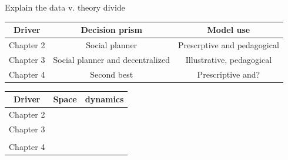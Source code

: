 Explain the data v. theory divide
\begin{table}[H]
\centering

\begin{tabular}{c|c|c}
Driver &  Decision prism  & Model use   \\
\hline
Chapter 2      &  Social planner         &   Prescrptive and pedagogical   \\
\hline
Chapter 3      &  Social planner and decentralized &  Illustrative, pedagogical  \\
\hline
Chapter 4      &      Second best    & Prescriptive and? \\   
\hline
\end{tabular}
\end{table}


\begin{table}[H]
\centering

\begin{tabular}{|c|c|c|}
Driver & \textbf{Space} & \textbf{dynamics}\\
\hline
Chapter 2      &            &                 \\
\hline
Chapter 3      &           &        \\
			  &                     &   \\
\hline
Chapter 4      &          &   \\   
\hline
\end{tabular}
\end{table}





